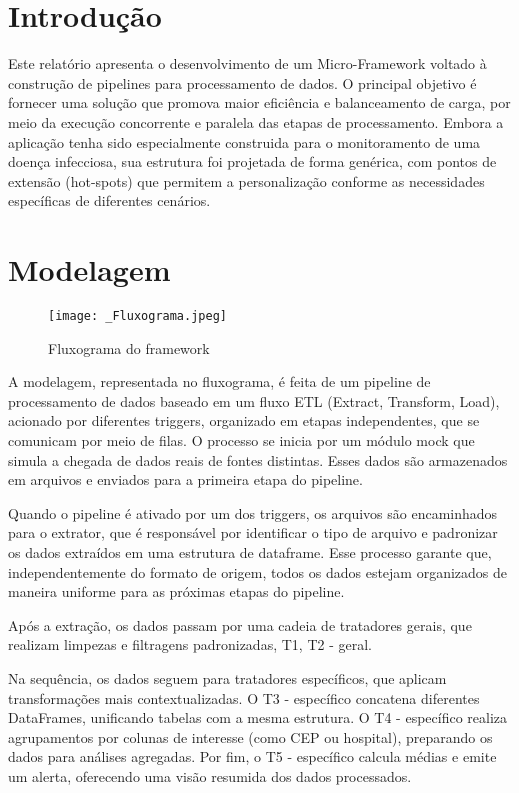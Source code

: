 \documentclass[a4paper,12pt]{article}
\begin{document}
\tableofcontents
\newpage


\section{Introdução}
Este relatório apresenta o desenvolvimento de um Micro-Framework voltado à construção de pipelines para processamento de dados. O principal objetivo é fornecer uma solução que promova maior eficiência e balanceamento de carga, por meio da execução concorrente e paralela das etapas de processamento. Embora a aplicação tenha sido especialmente construida para o monitoramento de uma doença infecciosa, sua estrutura foi projetada de forma genérica, com pontos de extensão (hot-spots) que permitem a personalização conforme as necessidades específicas de diferentes cenários.

\section{Modelagem}

\begin{figure}[H]
    \hspace{-1cm}
    \texttt{[image: \_Fluxograma.jpeg]}
    \caption{Fluxograma do framework}
    \label{fig:minha_imagem}
\end{figure}

A modelagem, representada no fluxograma, é feita de um pipeline de processamento de dados baseado em um fluxo ETL (Extract, Transform, Load), acionado por diferentes triggers, organizado em etapas independentes, que se comunicam por meio de filas. O processo se inicia por um módulo mock que simula a chegada de dados reais de fontes distintas. Esses dados são armazenados em arquivos e enviados para a primeira etapa do pipeline.

Quando o pipeline é ativado por um dos triggers, os arquivos são encaminhados para o extrator, que é responsável por identificar o tipo de arquivo e padronizar os dados extraídos em uma estrutura de dataframe. Esse processo garante que, independentemente do formato de origem, todos os dados estejam organizados de maneira uniforme para as próximas etapas do pipeline.

Após a extração, os dados passam por uma cadeia de tratadores gerais, que realizam limpezas e filtragens padronizadas, T1, T2 - geral.

Na sequência, os dados seguem para tratadores específicos, que aplicam transformações mais contextualizadas. O T3 - específico concatena diferentes DataFrames, unificando tabelas com a mesma estrutura. O T4 - específico realiza agrupamentos por colunas de interesse (como CEP ou hospital), preparando os dados para análises agregadas. Por fim, o T5 - específico calcula médias e emite um alerta, oferecendo uma visão resumida dos dados processados.
\end{document}
